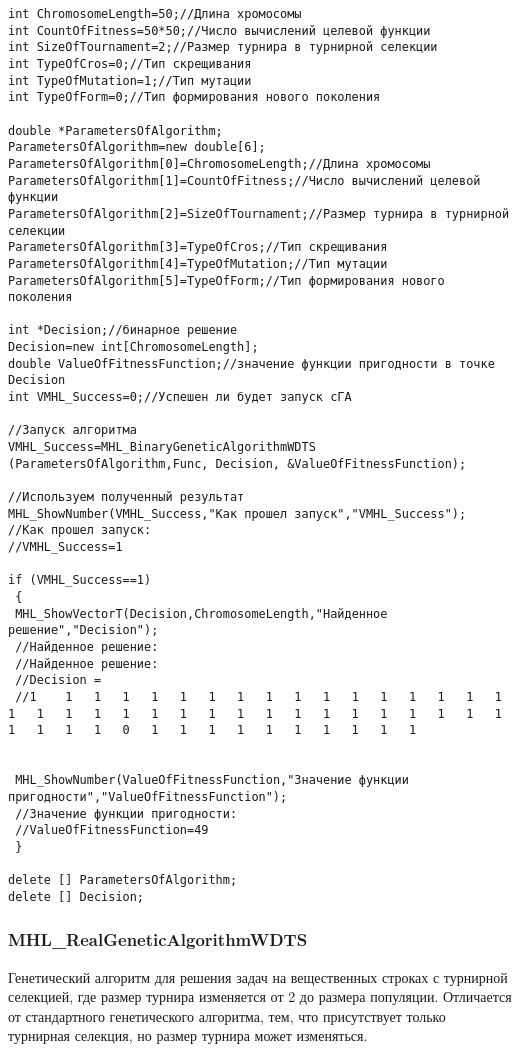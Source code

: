 \documentclass[a4paper,12pt]{article}
\begin{document}
\begin{lstlisting}[label=code_use_MHL_RealGeneticAlgorithmWDPOfNOfGPS,caption=Пример использования]
int ChromosomeLength=50;//Длина хромосомы
int CountOfFitness=50*50;//Число вычислений целевой функции
int SizeOfTournament=2;//Размер турнира в турнирной селекции
int TypeOfCros=0;//Тип скрещивания
int TypeOfMutation=1;//Тип мутации
int TypeOfForm=0;//Тип формирования нового поколения

double *ParametersOfAlgorithm;
ParametersOfAlgorithm=new double[6];
ParametersOfAlgorithm[0]=ChromosomeLength;//Длина хромосомы
ParametersOfAlgorithm[1]=CountOfFitness;//Число вычислений целевой функции
ParametersOfAlgorithm[2]=SizeOfTournament;//Размер турнира в турнирной селекции
ParametersOfAlgorithm[3]=TypeOfCros;//Тип скрещивания
ParametersOfAlgorithm[4]=TypeOfMutation;//Тип мутации
ParametersOfAlgorithm[5]=TypeOfForm;//Тип формирования нового поколения

int *Decision;//бинарное решение
Decision=new int[ChromosomeLength];
double ValueOfFitnessFunction;//значение функции пригодности в точке Decision
int VMHL_Success=0;//Успешен ли будет запуск cГА

//Запуск алгоритма
VMHL_Success=MHL_BinaryGeneticAlgorithmWDTS (ParametersOfAlgorithm,Func, Decision, &ValueOfFitnessFunction);

//Используем полученный результат
MHL_ShowNumber(VMHL_Success,"Как прошел запуск","VMHL_Success");
//Как прошел запуск:
//VMHL_Success=1

if (VMHL_Success==1)
 {
 MHL_ShowVectorT(Decision,ChromosomeLength,"Найденное решение","Decision");
 //Найденное решение:
 //Найденное решение:
 //Decision =
 //1	1	1	1	1	1	1	1	1	1	1	1	1	1	1	1	1	1	1	1	1	1	1	1	1	1	1	1	1	1	1	1	1	1	1	1	1	1	1	0	1	1	1	1	1	1	1	1	1	1


 MHL_ShowNumber(ValueOfFitnessFunction,"Значение функции пригодности","ValueOfFitnessFunction");
 //Значение функции пригодности:
 //ValueOfFitnessFunction=49
 }

delete [] ParametersOfAlgorithm;
delete [] Decision;
\end{lstlisting}

\subsubsection{MHL\_RealGeneticAlgorithmWDTS}\label{MHL_RealGeneticAlgorithmWDTS}

Генетический алгоритм для решения задач на вещественных строках  с турнирной селекцией, где размер турнира изменяется от 2 до размера популяции.
Отличается от стандартного генетического алгоритма, тем, что присутствует только турнирная селекция, но размер турнира может изменяться.
\end{document}
